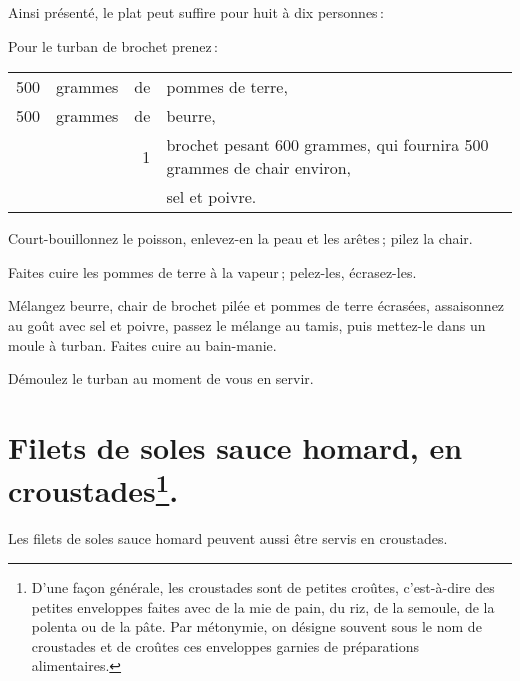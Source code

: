Ainsi présenté, le plat peut suffire pour huit à dix personnes :

\sk

Pour le turban de brochet prenez :

\medskip

\footnotesize
\begin{longtable}{rrrp{16em}}
    500 & grammes & de & pommes de terre,                                                                 \\
    500 & grammes & de & beurre,                                                                          \\
        &         &  1 & brochet pesant 600 grammes, qui fournira 500 grammes de chair environ,           \\
        &         &    & sel et poivre.                                                                   \\
\end{longtable}
\normalsize

Court-bouillonnez le poisson, enlevez-en la peau et les arêtes ; pilez la
chair.

Faites cuire les pommes de terre à la vapeur ; pelez-les, écrasez-les.

Mélangez beurre, chair de brochet pilée et pommes de terre écrasées,
assaisonnez au goût avec sel et poivre, passez le mélange au tamis, puis
mettez-le dans un moule à turban. Faites cuire au bain-manie.

Démoulez le turban au moment de vous en servir.

\section*{\centering Filets de soles sauce homard, en croustades\footnote{
D'une façon générale, les croustades sont de petites croûtes, c'est-à-dire des
petites enveloppes faites avec de la mie de pain, du riz, de la semoule, de la
polenta ou de la pâte. Par métonymie, on désigne souvent sous le nom de
croustades et de croûtes ces enveloppes garnies de préparations
alimentaires.}.}

Les filets de soles sauce homard peuvent aussi être servis en croustades.

